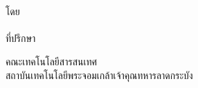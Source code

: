 \begin{titlepage}
  \vspace*{2cm}
  \makeatletter
  \begin{center}
    \begin{Huge}
      \@title
    \end{Huge}\\[1cm]
    \begin{huge}
      \@subtitle
    \end{huge}\\[1cm]
    \textsc{โดย}\\[0.5cm]
    \@author\\[1cm]
    \textsc{ที่ปรึกษา}\\[0.5cm]
    \@supervisor
    \vfill
    \begin{Large}
      คณะเทคโนโลยีสารสนเทศ\\[0.2cm]
      สถาบันเทคโนโลยีพระจอมเกล้าเจ้าคุณทหารลาดกระบัง
    \end{Large}
  \end{center}
  \makeatother
\end{titlepage}

\newpage
\null
\thispagestyle{empty}
\newpage
